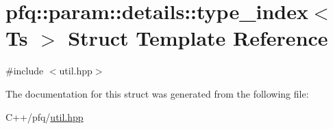 \hypertarget{structpfq_1_1param_1_1details_1_1type__index}{}\section{pfq\+:\+:param\+:\+:details\+:\+:type\+\_\+index$<$ Ts $>$ Struct Template Reference}
\label{structpfq_1_1param_1_1details_1_1type__index}


{\ttfamily \#include $<$util.\+hpp$>$}



The documentation for this struct was generated from the following file\+:\begin{DoxyCompactItemize}
\item 
C++/pfq/\hyperlink{util_8hpp}{util.\+hpp}\end{DoxyCompactItemize}
